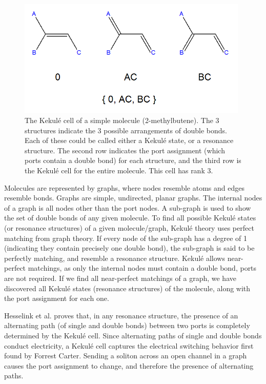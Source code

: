 \documentclass[12pt]{article}
\begin{document}
\begin{figure}[ht!]
\centering
\includegraphics[width=110mm]{KekuleCell.png}
\caption{The Kekul\'e cell of a simple molecule (2-methylbutene). The 3 structures indicate the 3 possible arrangements of double bonds. Each of these could be called either a Kekul\'e state, or a resonance structure. The second row indicates the port assignment (which ports contain a double bond) for each structure, and the third row is the Kekul\'e cell for the entire molecule. This cell has rank 3.}
\label{fig:kekuleCell}
\end{figure}

Molecules are represented by graphs, where nodes resemble atoms and edges resemble bonds. Graphs are simple, undirected, planar graphs. The internal nodes of a graph is all nodes other than the port nodes. A sub-graph is used to show the set of double bonds of any given molecule. To find all possible Kekul\'e states (or resonance structures) of a given molecule/graph, Kekul\'e theory uses perfect matching from graph theory. If every node of the sub-graph has a degree of 1 (indicating they contain precisely one double bond), the sub-graph is said to be perfectly matching, and resemble a resonance structure. Kekul\'e allows near-perfect matchings, as only the internal nodes must contain a double bond, ports are not required. If we find all near-perfect matchings of a graph, we have discovered all Kekul\'e states (resonance structures) of the molecule, along with the port assignment for each one.

Hesselink et al.\cite{HH13} proves that, in any resonance structure, the presence of an alternating path (of single and double bonds) between two ports is completely determined by the Kekul\'e cell. Since alternating paths of single and double bonds conduct electricity, a Kekul\'e cell captures the electrical switching behavior first found by Forrest Carter. Sending a soliton across an open channel in a graph causes the port assignment to change, and therefore the presence of alternating paths.
\end{document}
